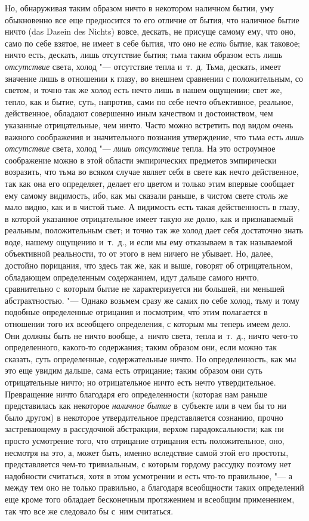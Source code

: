 Но, обнаруживая таким образом ничто в некотором наличном бытии, уму обыкновенно
все еще предносится то его отличие от бытия, что наличное бытие ничто (das
Dasein des Nichts) вовсе, дескать, не присуще самому ему, что оно, само по себе
взятое, не имеет в себе бытия, что оно не {\em есть} бытие, как таковое; ничто
есть, дескать, лишь отсутствие бытия; тьма таким образом есть лишь
{\em отсутствие} света, холод "--- отсутствие тепла и~т.~д. Тьма, дескать,
имеет значение лишь в отношении к глазу, во внешнем сравнении с положительным,
со светом, и точно так же холод есть нечто лишь в нашем ощущении; свет же,
тепло, как и бытие, суть, напротив, сами по себе нечто объективное, реальное,
действенное, обладают совершенно иным качеством и достоинством, чем указанные
отрицательные, чем ничто. Часто можно встретить под видом очень важного
соображения и значительного познания утверждение, что тьма есть
{\em лишь отсутствие} света, холод "--- {\em лишь отсутствие} тепла. На это
остроумное соображение можно в этой области эмпирических предметов эмпирически
возразить, что тьма во всяком случае являет себя в свете как нечто действенное,
так как она его определяет, делает его цветом и только этим впервые сообщает
ему самому видимость, ибо, как мы сказали раньше, в чистом свете столь же мало
видно, как и в чистой тьме. А видимость есть такая действенность в глазу, в
которой указанное отрицательное имеет такую же долю, как и признаваемый
реальным, положительным свет; и точно так же холод дает себя достаточно знать
воде, нашему ощущению и~т.~д., и если мы ему отказываем в так называемой
объективной реальности, то от этого в нем ничего не убывает. Но, далее,
достойно порицания, что здесь так же, как и выше, говорят об отрицательном,
обладающем определенным содержанием, идут дальше самого ничто, сравнительно
с~которым бытие не характеризуется ни большей, ни меньшей абстрактностью. "---
Однако возьмем сразу же самих по себе холод, тьму и тому подобные определенные
отрицания и посмотрим, чт\'{о} этим полагается в отношении того их всеобщего
определения, с которым мы теперь имеем дело. Они должны быть не ничто вообще,
а~ничто света, тепла и~т.~д., ничто чего-то определенного, какого-то
содержания; таким образом они, если можно так сказать, суть определенные,
содержательные ничто. Но определенность, как мы это еще увидим дальше, сама
есть отрицание; таким образом они суть отрицательные ничто; но отрицательное
ничто есть нечто утвердительное. Превращение ничто благодаря его определенности
(которая нам раньше представилась как некоторое {\em наличное бытие} в~субъекте
или в чем бы то ни было другом) в некоторое утвердительное представляется
сознанию, прочно застревающему в рассудочной абстракции, верхом
парадоксальности; как ни просто усмотрение того, что отрицание отрицания есть
положительное, оно, несмотря на это, а, может быть, именно вследствие самой
этой его простоты, представляется чем-то тривиальным, с которым гордому
рассудку поэтому нет надобности считаться, хотя в этом усмотрении и есть что-то
правильное, "--- а между тем оно не только правильно, а благодаря всеобщности
таких определений еще кроме того обладает бесконечным протяжением и всеобщим
применением, так что все же следовало бы с~ним считаться.

